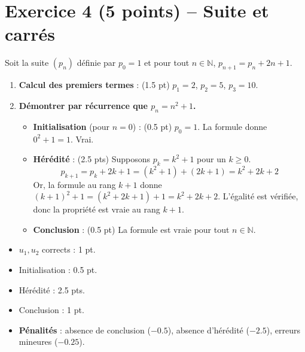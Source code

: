 \documentclass[14pt, a4paper]{extarticle}
\newcommand{\N}{\mathbb{N}}
\begin{document}
\section*{Exercice 4 (5 points) -- Suite et carrés}
Soit la suite $(p_n)$ définie par $p_0 = 1$ et pour tout $n \in \N$, $p_{n+1} = p_n + 2n + 1$.

\begin{enumerate}
    \item \textbf{Calcul des premiers termes} : (1.5 pt)
    $p_1 = 2$, $p_2 = 5$, $p_3 = 10$.

    \item \textbf{Démontrer par récurrence que $p_n = n^2 + 1$.}
    \begin{itemize}
        \item \textbf{Initialisation} (pour $n=0$) : (0.5 pt)
        $p_0 = 1$. La formule donne $0^2 + 1 = 1$. Vrai.
        \item \textbf{Hérédité} : (2.5 pts)
        Supposons $p_k = k^2 + 1$ pour un $k \ge 0$.
        \[ p_{k+1} = p_k + 2k + 1 = (k^2 + 1) + (2k + 1) = k^2 + 2k + 2 \]
        Or, la formule au rang $k+1$ donne $(k+1)^2 + 1 = (k^2 + 2k + 1) + 1 = k^2 + 2k + 2$.
        L'égalité est vérifiée, donc la propriété est vraie au rang $k+1$.
        \item \textbf{Conclusion} : (0.5 pt)
        La formule est vraie pour tout $n \in \N$.
    \end{itemize}
\end{enumerate}

\newpage



\begin{tcolorbox}[title=Exercice 1 (5 points)]
\begin{itemize}
    \item $u_1, u_2$ corrects : 1 pt.
    \item Initialisation : 0.5 pt.
    \item Hérédité : 2.5 pts.
    \item Conclusion : 1 pt.
    \item \textbf{Pénalités} : absence de conclusion ($-0.5$), absence d’hérédité ($-2.5$), erreurs mineures ($-0.25$).
\end{itemize}
\end{tcolorbox}
\end{document}
